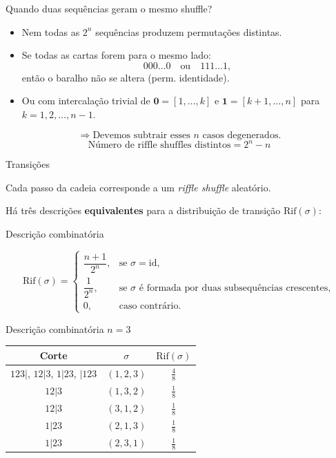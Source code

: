 \documentclass{beamer}
\begin{document}
\begin{frame}{Quando duas sequências geram o mesmo shuffle?}
  \begin{itemize}
  \item Nem todas as $2^n$ sequências produzem permutações distintas.
  \item Se todas as cartas forem para o mesmo lado:
    \[
      000\ldots0 \quad \text{ou} \quad 111\ldots1,
    \]
    então o baralho não se altera (perm. identidade).
  \item Ou com intercalação trivial de $\mathrm{\mathbf{0}} = [1,\dots,k]$ e
    $\mathrm{\mathbf{1}}=[k+1,\dots,n]$ para $k=1,2,\dots,n-1$.
  \end{itemize}
  \[
    \Rightarrow \text{Devemos subtrair esses } n \text{ casos degenerados.}
  \]
  \[
    \boxed{
      \text{Número de riffle shuffles distintos} = 2^n - n
    }
  \]
  
\end{frame}
\begin{frame}{Transições}

  Cada passo da cadeia corresponde a um \emph{riffle shuffle}
  aleatório.

  \bigskip
  
  Há três descrições \textbf{equivalentes} para a distribuição de
  transição $\mathrm{Rif}(\sigma)$:

\end{frame}
\begin{frame}{Descrição combinatória}

  \[
    \mathrm{Rif}(\sigma)
    =
    \begin{cases}
      \dfrac{n+1}{2^n}, & \text{se } \sigma = \mathrm{id},\\[10pt]
      \dfrac{1}{2^n}, & \text{se } \sigma \text{ é formada por duas subsequências crescentes},\\[10pt]
      0, & \text{caso contrário}.
    \end{cases}
  \]
\end{frame}
\begin{frame}{Descrição combinatória $n=3$}
  \begin{center}
    \begin{tabular}{c|c|c}
      \textbf{Corte} & $\sigma$ & $\mathrm{Rif}(\sigma)$ \\
      \hline
      $123|$, $12|3$, $1|23$, $|123$ & $(1,2,3)$ & $\tfrac{4}{8}$ \\[.5em]
      $12|3$ & $(1,3,2)$ & $\tfrac{1}{8}$ \\[.5em]
      $12|3$ & $(3,1,2)$ & $\tfrac{1}{8}$ \\[.5em]
      $1|23$ & $(2,1,3)$ & $\tfrac{1}{8}$ \\[.5em]
      $1|23$ & $(2,3,1)$ & $\tfrac{1}{8}$
    \end{tabular}
  \end{center}
\end{frame}
\end{document}
